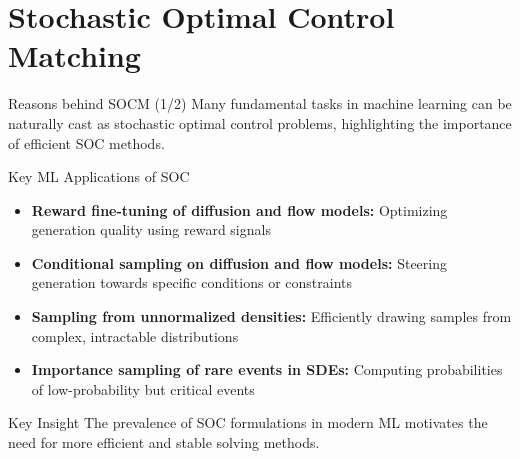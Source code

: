 \documentclass[aspectratio=169,xcolor=dvipsnames]{beamer}
\begin{document}

\section{Stochastic Optimal Control Matching}

\begin{frame}{Reasons behind SOCM (1/2)}
    Many fundamental tasks in machine learning can be naturally cast as stochastic optimal control problems, highlighting the importance of efficient SOC methods.
    
    \vspace{0.4cm}
    
    \begin{block}{Key ML Applications of SOC}
        \begin{itemize}
            \item \textbf{Reward fine-tuning of diffusion and flow models:} Optimizing generation quality using reward signals
            
            \vspace{0.2cm}
            
            \item \textbf{Conditional sampling on diffusion and flow models:} Steering generation towards specific conditions or constraints
            
            \vspace{0.2cm}
            
            \item \textbf{Sampling from unnormalized densities:} Efficiently drawing samples from complex, intractable distributions
            
            \vspace{0.2cm}
            
            \item \textbf{Importance sampling of rare events in SDEs:} Computing probabilities of low-probability but critical events
        \end{itemize}
    \end{block}
    
    \vspace{0.3cm}
    
    \begin{alertblock}{Key Insight}
        The prevalence of SOC formulations in modern ML motivates the need for more efficient and stable solving methods.
    \end{alertblock}
\end{frame}
\end{document}
